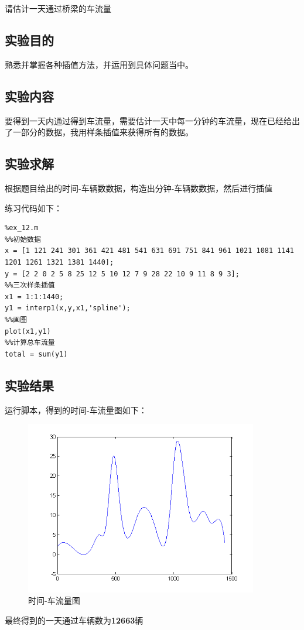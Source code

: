 \documentclass[UTF8]{article}
\begin{document}
请估计一天通过桥梁的车流量
\subsection{实验目的}
熟悉并掌握各种插值方法，并运用到具体问题当中。
\subsection{实验内容}
要得到一天内通过得到车流量，需要估计一天中每一分钟的车流量，现在已经给出了一部分的数据，我用样条插值来获得所有的数据。
\subsection{实验求解}
根据题目给出的时间-车辆数数据，构造出分钟-车辆数数据，然后进行插值

练习代码如下：
\lstset{language=Matlab}
\begin{lstlisting}
%ex_12.m
%%初始数据
x = [1 121 241 301 361 421 481 541 631 691 751 841 961 1021 1081 1141 1201 1261 1321 1381 1440];
y = [2 2 0 2 5 8 25 12 5 10 12 7 9 28 22 10 9 11 8 9 3];
%%三次样条插值
x1 = 1:1:1440;
y1 = interp1(x,y,x1,'spline');
%%画图
plot(x1,y1)
%%计算总车流量
total = sum(y1)
\end{lstlisting}
\subsection{实验结果}
运行脚本，得到的时间-车流量图如下：
\begin{figure}[htbp] 
\centering\includegraphics[width=4in]{f2.png} 
\caption{时间-车流量图}
\end{figure} 

最终得到的一天通过车辆数为\textbf{12663}辆
\end{document}
